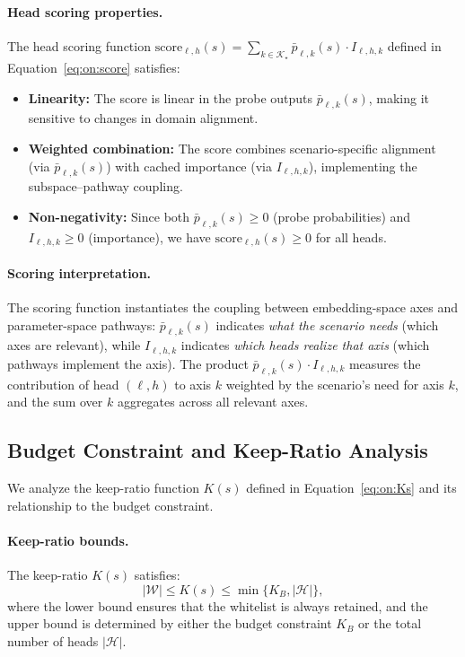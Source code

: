 \paragraph{Head scoring properties.}
The head scoring function $\mathrm{score}_{\ell,h}(s) = \sum_{k \in \mathcal{K}_\star} \bar{p}_{\ell,k}(s) \cdot I_{\ell,h,k}$ defined in Equation~\eqref{eq:on:score} satisfies:
\begin{itemize}
    \item \textbf{Linearity:} The score is linear in the probe outputs $\bar{p}_{\ell,k}(s)$, making it sensitive to changes in domain alignment.
    \item \textbf{Weighted combination:} The score combines scenario-specific alignment (via $\bar{p}_{\ell,k}(s)$) with cached importance (via $I_{\ell,h,k}$), implementing the subspace--pathway coupling.
    \item \textbf{Non-negativity:} Since both $\bar{p}_{\ell,k}(s) \geq 0$ (probe probabilities) and $I_{\ell,h,k} \geq 0$ (importance), we have $\mathrm{score}_{\ell,h}(s) \geq 0$ for all heads.
\end{itemize}

\paragraph{Scoring interpretation.}
The scoring function instantiates the coupling between embedding-space axes and parameter-space pathways: $\bar{p}_{\ell,k}(s)$ indicates \emph{what the scenario needs} (which axes are relevant), while $I_{\ell,h,k}$ indicates \emph{which heads realize that axis} (which pathways implement the axis).
The product $\bar{p}_{\ell,k}(s) \cdot I_{\ell,h,k}$ measures the contribution of head $(\ell,h)$ to axis $k$ weighted by the scenario's need for axis $k$, and the sum over $k$ aggregates across all relevant axes.

\subsection{Budget Constraint and Keep-Ratio Analysis}
\label{app:math_budget}

We analyze the keep-ratio function $K(s)$ defined in Equation~\eqref{eq:on:Ks} and its relationship to the budget constraint.

\paragraph{Keep-ratio bounds.}
The keep-ratio $K(s)$ satisfies:
\begin{equation}
|\mathcal{W}| \leq K(s) \leq \min\{K_B, |\mathcal{H}|\},
\end{equation}
where the lower bound ensures that the whitelist is always retained, and the upper bound is determined by either the budget constraint $K_B$ or the total number of heads $|\mathcal{H}|$.

